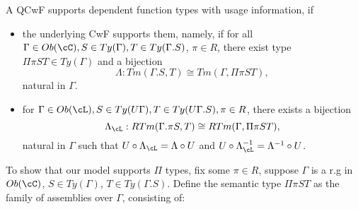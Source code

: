 \documentclass[12pt,a4paper]{article}
\begin{document}
\begin{definition}
  \label{def:prod-types}
  A QCwF supports dependent function types with usage information, if
  \begin{itemize}
    
    \item the underlying CwF \cC supports them, namely, if for all $\Gamma \in \ob\cC, S \in Ty(\Gamma), T \in Ty(\Gamma . S)$, $\pi \in R$, there exist type $\Pi\pi S T \in Ty(\Gamma)$ and a bijection $$\Lambda : Tm(\Gamma.S, T) \cong Tm(\Gamma, \Pi\pi S T) \label{eq:dep-prod-cwf},$$ natural in $\Gamma$.
    
    \item for $\Gamma \in \ob\cL, S \in Ty(U\Gamma), T \in Ty(U\Gamma . S), \pi \in R$, there exists a bijection $$\Lambda_\cL : RTm(\Gamma.\pi S, T) \cong RTm(\Gamma, \Pi\pi S T) \label{eq:dep-prod-qcwf},$$ natural in $\Gamma$ such that $U \comp \Lambda_\cL = \Lambda \comp U$ and $U \comp \Lambda^{-1}_\cL = \Lambda^{-1}\comp U$.    
  
  \end{itemize}  
\end{definition}

To show that our model supports $\Pi$ types, fix some $\pi \in R$, suppose $\Gamma$ is a r.g in $\ob\cC$, $S \in Ty(\Gamma)$, $T \in Ty(\Gamma.S)$. 
Define the semantic type $\Pi \pi S T$ as the family of assemblies over $\Gamma$, consisting of:
\end{document}

